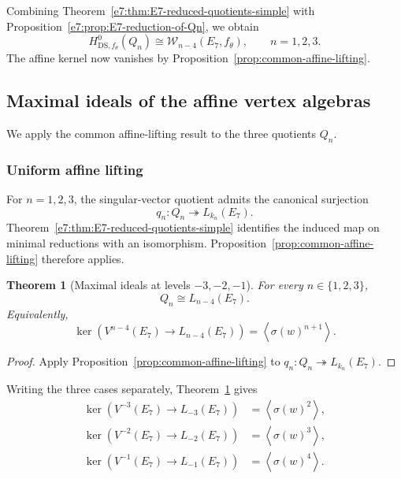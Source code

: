 \documentclass[11pt,reqno]{amsart}
\newtheorem{theorem}{Theorem}[section]
\theoremstyle{definition}
\theoremstyle{remark}
\begin{document}
Combining Theorem~\ref{e7:thm:E7-reduced-quotients-simple} with
Proposition~\ref{e7:prop:E7-reduction-of-Qn}, we obtain
\begin{equation*}
  H^0_{\mathrm{DS},f_\theta}(Q_n)
  \cong
  \mathcal W_{n-4}(E_7,f_\theta),
  \qquad n=1,2,3.
\end{equation*}
The affine kernel now vanishes by Proposition~\ref{prop:common-affine-lifting}.



\subsection{Maximal ideals of the affine vertex algebras}


We apply the common affine-lifting result to the three quotients $Q_n$.

\subsubsection{Uniform affine lifting}


For $n=1,2,3$, the singular-vector quotient admits the canonical surjection
\begin{equation*}
 q_n:Q_n\twoheadrightarrow L_{k_n}(E_7).
\end{equation*}
Theorem~\ref{e7:thm:E7-reduced-quotients-simple} identifies the induced map
on minimal reductions with an isomorphism.  Proposition~\ref{prop:common-affine-lifting}
therefore applies.

\begin{theorem}[Maximal ideals at levels \(-3,-2,-1\)]
\label{e7:thm:E7-main-maximal-ideal}
For every \(n\in\{1,2,3\}\),
\begin{equation*}
  Q_n\cong L_{n-4}(E_7).
\end{equation*}
Equivalently,
\begin{equation*}
  \ker\!\left(
    V^{n-4}(E_7)\longrightarrow L_{n-4}(E_7)
  \right)
  =
  \left\langle\sigma(w)^{n+1}\right\rangle.
\end{equation*}
\end{theorem}

\begin{proof}
Apply Proposition~\ref{prop:common-affine-lifting} to
$q_n:Q_n\twoheadrightarrow L_{k_n}(E_7)$.
\end{proof}

Writing the three cases separately, Theorem~\ref{e7:thm:E7-main-maximal-ideal}
gives
\begin{align*}
  \ker\!\left(V^{-3}(E_7)\longrightarrow L_{-3}(E_7)\right)
  &=\left\langle\sigma(w)^2\right\rangle,\\
  \ker\!\left(V^{-2}(E_7)\longrightarrow L_{-2}(E_7)\right)
  &=\left\langle\sigma(w)^3\right\rangle,\\
  \ker\!\left(V^{-1}(E_7)\longrightarrow L_{-1}(E_7)\right)
  &=\left\langle\sigma(w)^4\right\rangle.
\end{align*}
\end{document}
